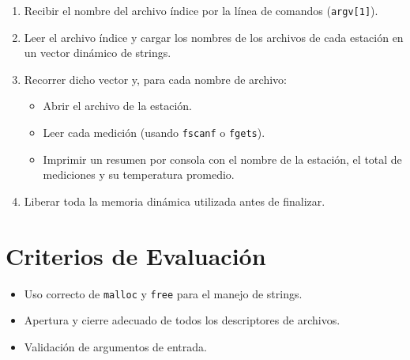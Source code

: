 \documentclass[12pt,a4paper]{article}
\begin{document}
\begin{enumerate}
    \item Recibir el nombre del archivo índice por la línea de comandos (\texttt{argv[1]}).
    \item Leer el archivo índice y cargar los nombres de los archivos de cada estación en un vector dinámico de strings.
    \item Recorrer dicho vector y, para cada nombre de archivo:
    \begin{itemize}
        \item Abrir el archivo de la estación.
        \item Leer cada medición (usando \texttt{fscanf} o \texttt{fgets}).
        \item Imprimir un resumen por consola con el nombre de la estación, el total de mediciones y su temperatura promedio.
    \end{itemize}
    \item Liberar toda la memoria dinámica utilizada antes de finalizar.
\end{enumerate}

\section*{Criterios de Evaluación}
\begin{itemize}
    \item Uso correcto de \texttt{malloc} y \texttt{free} para el manejo de strings.
    \item Apertura y cierre adecuado de todos los descriptores de archivos.
    \item Validación de argumentos de entrada.
\end{itemize}
\end{document}
